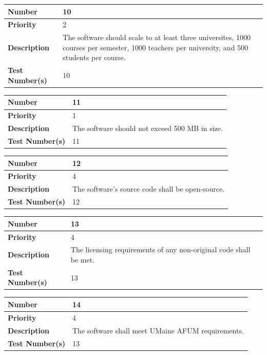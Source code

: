 \documentclass{article}
\begin{document}
\begin{center}
\bigskip
{}
\begin{tabular}{|p{3.5cm}|p{7.5cm}|} 
\hline
\textbf{Number} & 10  \\
\hline
\textbf{Priority} & 2\\ 
\hline
\textbf{Description} & The software should scale to at least three universites, 1000 courses per semester, 1000 teachers per university, and 500 students per course. \\ 
\hline
\textbf{Test Number(s) }& 10 \\ 
\hline
\end{tabular}


\bigskip
{}
\begin{tabular}{|p{3.5cm}|p{7.5cm}|} 
\hline
\textbf{Number} & 11  \\
\hline
\textbf{Priority} & 1 \\ 
\hline
\textbf{Description} & The software should not exceed 500 MB in size. \\ 
\hline
\textbf{Test Number(s) }& 11 \\ 
\hline
\end{tabular}


\bigskip
{}
\begin{tabular}{|p{3.5cm}|p{7.5cm}|} 
\hline
\textbf{Number} & 12  \\
\hline
\textbf{Priority} & 4\\ 
\hline
\textbf{Description} & The software's source code shall be open-source. \\ 
\hline
\textbf{Test Number(s) }& 12\\ 
\hline
\end{tabular}


\bigskip
{}
\begin{tabular}{|p{3.5cm}|p{7.5cm}|} 
\hline
\textbf{Number} & 13  \\
\hline
\textbf{Priority} & 4 \\ 
\hline
\textbf{Description} & The licensing requirements of any non-original code shall be met.\\ 
\hline
\textbf{Test Number(s) }& 13 \\ 
\hline
\end{tabular}

\bigskip
\vspace{.5in}
\begin{tabular}{|p{3.5cm}|p{7.5cm}|} 
\hline
\textbf{Number} & 14  \\
\hline
\textbf{Priority} & 4 \\ 
\hline
\textbf{Description} & The software shall meet UMaine AFUM requirements.\\ 
\hline
\textbf{Test Number(s) }& 13 \\ 
\hline
\end{tabular}

\end{center}
\end{document}
